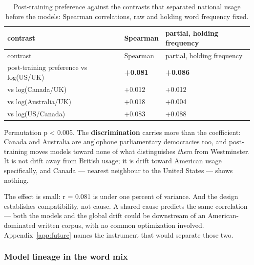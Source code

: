 \begingroup\small
\begin{longtable}[]{@{}lll@{}}
\caption{Post-training preference against the contrasts that separated national usage before the models: Spearman correlations, raw and holding word frequency fixed.}\label{tab:american-alignment}\\
\toprule\noalign{}
contrast & Spearman & partial, holding frequency \\
\midrule\noalign{}
\endfirsthead
\toprule\noalign{}
contrast & Spearman & partial, holding frequency \\
\midrule\noalign{}
\endhead
\bottomrule\noalign{}
\endlastfoot
post-training preference vs log(US/UK) & \textbf{+0.081} & \textbf{+0.086} \\
vs log(Canada/UK) & +0.012 & +0.012 \\
vs log(Australia/UK) & +0.018 & +0.004 \\
vs log(US/Canada) & +0.083 & +0.088 \\
\end{longtable}
\endgroup

Permutation p \textless{} 0.005. The \textbf{discrimination} carries more than the coefficient:
Canada and Australia are anglophone parliamentary democracies too, and
post-training moves models toward none of what distinguishes \emph{them} from
Westminster. It is not drift away from British usage; it is drift toward
American usage specifically, and Canada --- nearest neighbour to the United
States --- shows nothing.

The effect is small: r = 0.081 is under one percent of variance. And the design
establishes compatibility, not cause. A shared cause predicts the same
correlation --- both the models and the global drift could be downstream of an
American-dominated written corpus, with no common optimization involved. Appendix~\ref{app:future}
names the instrument that would separate those two.

\subsubsection{Model lineage in the word mix}\label{sec:model-lineage}

